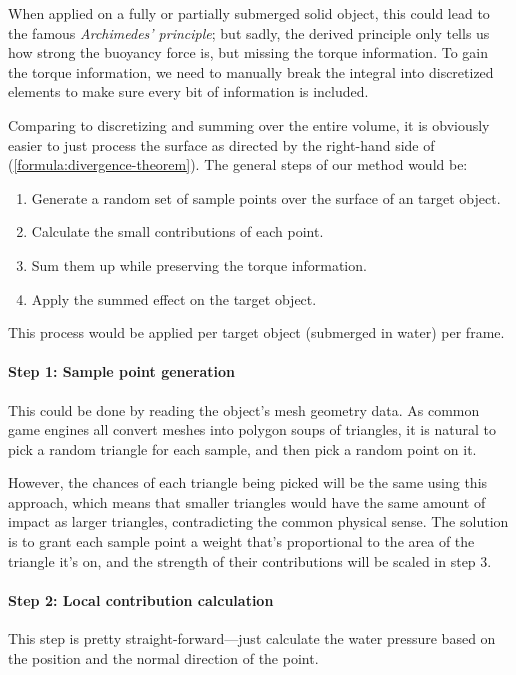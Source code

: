 \documentclass{article}
\begin{document}
When applied on a fully or partially submerged solid object, this could lead to the famous \emph{Archimedes' principle};
but sadly, the derived principle only tells us how strong the buoyancy force is, but missing the torque information.
To gain the torque information, we need to manually break the integral into discretized elements to make sure every bit of information is included.

Comparing to discretizing and summing over the entire volume, it is obviously easier to just process the surface as directed by the right-hand side of (\ref{formula:divergence-theorem}).
The general steps of our method would be:
\begin{enumerate}
	\item Generate a random set of sample points over the surface of an target object.
	\item Calculate the small contributions of each point.
	\item Sum them up while preserving the torque information.
	\item Apply the summed effect on the target object.
\end{enumerate}
This process would be applied per target object (submerged in water) per frame.

\paragraph*{Step 1: Sample point generation}

This could be done by reading the object's mesh geometry data.
As common game engines all convert meshes into polygon soups of triangles, it is natural to pick a random triangle for each sample, and then pick a random point on it.

However, the chances of each triangle being picked will be the same using this approach, which means that smaller triangles would have the same amount of impact as larger triangles, contradicting the common physical sense.
The solution is to grant each sample point a weight that's proportional to the area of the triangle it's on, and the strength of their contributions will be scaled in step 3.

\paragraph*{Step 2: Local contribution calculation}

This step is pretty straight-forward---just calculate the water pressure based on the position and the normal direction of the point.
\end{document}
